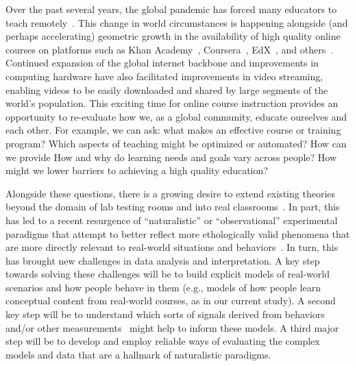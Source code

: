\documentclass[10pt]{article}
\begin{document}
Over the past several years, the global pandemic has forced many educators to
teach remotely~\citep{MoseEtal21, ShimLee20, KawaEtal21, Whal20}. This change
in world circumstances is happening alongside (and perhaps accelerating)
geometric growth in the availability of high quality online courses on
platforms such as Khan Academy~\citep{Khan04}, Coursera~\citep{Youn12},
EdX~\citep{Kolo13}, and others~\citep{RhoaEtal13}. Continued expansion of the
global internet backbone and improvements in computing hardware have also
facilitated improvements in video streaming, enabling videos to be easily
downloaded and shared by large segments of the world's population. This
exciting time for online course instruction provides an opportunity to
re-evaluate how we, as a global community, educate ourselves and each other.
For example, we can ask: what makes an effective course or training program?
Which aspects of teaching might be optimized or automated? How can we provide
How and why do learning needs and goals vary across people? How might we lower
barriers to achieving a high quality education?

Alongside these questions, there is a growing desire to extend existing
theories beyond the domain of lab testing rooms and into real
classrooms~\citep{Kauf03}. In part, this has led to a recent resurgence of
``naturalistic'' or ``observational'' experimental paradigms that attempt to
better reflect more ethologically valid phenomena that are more directly
relevant to real-world situations and behaviors~\citep{NastEtal20}. In turn,
this has brought new challenges in data analysis and interpretation. A key step
towards solving these challenges will be to build explicit models of real-world
scenarios and how people behave in them (e.g., models of how people learn
conceptual content from real-world courses, as in our current study). A second
key step will be to understand which sorts of signals derived from behaviors
and/or other measurements~\citep[e.g., neurophysiological data; ][]{NguyEtal22,
MeshEtal20, PoulEtal17, BeviEtal19, DikkEtal17} might help to inform these
models. A third major step will be to develop and employ reliable ways of
evaluating the complex models and data that are a hallmark of naturalistic
paradigms.
\end{document}
